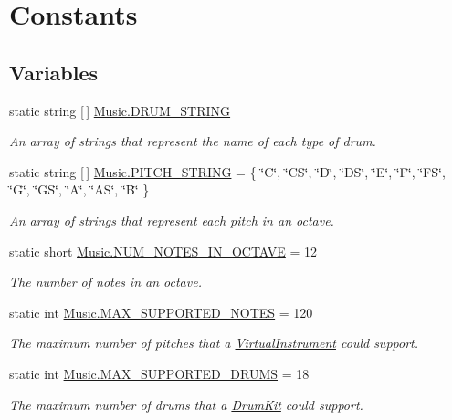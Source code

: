 \hypertarget{group___music_constants}{}\section{Constants}
\label{group___music_constants}
\subsection*{Variables}
\begin{DoxyCompactItemize}
\item 
static string \mbox{[}$\,$\mbox{]} \hyperlink{group___music_constants_ga1381281d147886a2cf3584ab0c7a67d6}{Music.\+D\+R\+U\+M\+\_\+\+S\+T\+R\+I\+NG}
\begin{DoxyCompactList}\small\item\em An array of strings that represent the name of each type of drum. \end{DoxyCompactList}\item 
static string \mbox{[}$\,$\mbox{]} \hyperlink{group___music_constants_ga0f6eb5ac330d374c6b5021a0ba11c2bc}{Music.\+P\+I\+T\+C\+H\+\_\+\+S\+T\+R\+I\+NG} = \{ \char`\"{}C\char`\"{}, \char`\"{}CS\char`\"{}, \char`\"{}D\char`\"{}, \char`\"{}DS\char`\"{}, \char`\"{}E\char`\"{}, \char`\"{}F\char`\"{}, \char`\"{}FS\char`\"{}, \char`\"{}G\char`\"{}, \char`\"{}GS\char`\"{}, \char`\"{}A\char`\"{}, \char`\"{}AS\char`\"{}, \char`\"{}B\char`\"{} \}
\begin{DoxyCompactList}\small\item\em An array of strings that represent each pitch in an octave. \end{DoxyCompactList}\item 
static short \hyperlink{group___music_constants_gab346f7d8791bf021799da7786cde44c1}{Music.\+N\+U\+M\+\_\+\+N\+O\+T\+E\+S\+\_\+\+I\+N\+\_\+\+O\+C\+T\+A\+VE} = 12
\begin{DoxyCompactList}\small\item\em The number of notes in an octave. \end{DoxyCompactList}\item 
static int \hyperlink{group___music_constants_gaaf07da909a12e9fec0e43b70864f27b7}{Music.\+M\+A\+X\+\_\+\+S\+U\+P\+P\+O\+R\+T\+E\+D\+\_\+\+N\+O\+T\+ES} = 120
\begin{DoxyCompactList}\small\item\em The maximum number of pitches that a \hyperlink{class_virtual_instrument}{Virtual\+Instrument} could support. \end{DoxyCompactList}\item 
static int \hyperlink{group___music_constants_gabce1a1ac5b9b6355af6bd7fb3868467a}{Music.\+M\+A\+X\+\_\+\+S\+U\+P\+P\+O\+R\+T\+E\+D\+\_\+\+D\+R\+U\+MS} = 18
\begin{DoxyCompactList}\small\item\em The maximum number of drums that a \hyperlink{class_drum_kit}{Drum\+Kit} could support. \end{DoxyCompactList}\end{DoxyCompactItemize}


